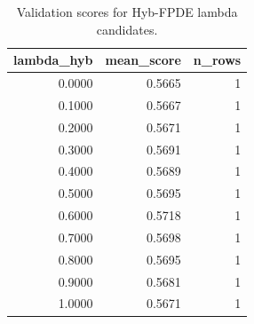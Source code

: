 \begin{table}[t]
\caption{Validation scores for Hyb-FPDE lambda candidates.}
\label{tab:lambda_distribution_computed}
\centering
\begin{tabular}{rrr}
\toprule
lambda\_hyb & mean\_score & n\_rows \\
\midrule
0.0000 & 0.5665 & 1 \\
0.1000 & 0.5667 & 1 \\
0.2000 & 0.5671 & 1 \\
0.3000 & 0.5691 & 1 \\
0.4000 & 0.5689 & 1 \\
0.5000 & 0.5695 & 1 \\
0.6000 & 0.5718 & 1 \\
0.7000 & 0.5698 & 1 \\
0.8000 & 0.5695 & 1 \\
0.9000 & 0.5681 & 1 \\
1.0000 & 0.5671 & 1 \\
\bottomrule
\end{tabular}

\end{table}
